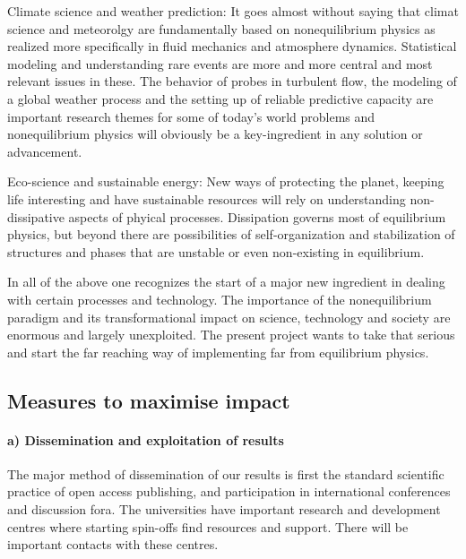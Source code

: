 \begin{compactenum}
\item Climate science and weather prediction: It goes almost without saying that climat science and meteorolgy are fundamentally based on nonequilibrium physics as realized more specifically in fluid mechanics and atmosphere dynamics. Statistical modeling and understanding rare events are more and more central and most relevant issues in these. The behavior of probes in turbulent flow, the modeling of a global weather process and the setting up of reliable predictive capacity  are important research themes for some of today's world problems and nonequilibrium physics will obviously be a key-ingredient in any solution or advancement. 
\item Eco-science and sustainable energy: New ways of protecting the planet, keeping life interesting and have sustainable resources will rely on understanding non-dissipative aspects of phyical processes.  Dissipation governs most of equilibrium physics, but beyond there are possibilities of self-organization and stabilization of structures and phases that are unstable or even non-existing in equilibrium.
\end{compactenum}

In all of the above one recognizes the start of a major new ingredient in
dealing with certain processes and technology. The importance of the
nonequilibrium paradigm and its transformational impact on science, technology
and society are enormous and largely unexploited. The present project wants to
take that serious and start the far reaching way of implementing far from
equilibrium physics.


\subsection{Measures to maximise impact}

\paragraph{a) Dissemination and exploitation of results}

The major method of dissemination of our results is first the standard scientific practice of open access publishing, and participation in international conferences and discussion fora.  
The universities have important research and development centres where starting spin-offs find resources and support.
There will be important contacts with these centres.  


